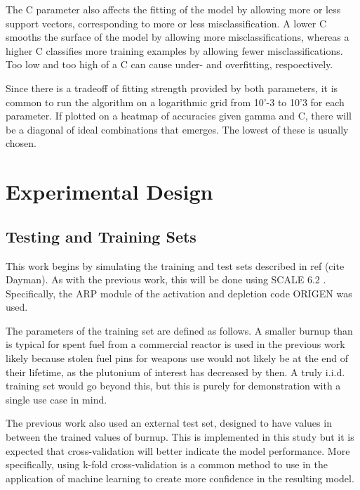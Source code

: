 \documentclass{anstrans}
\begin{document}
The C parameter also affects the fitting of the model by allowing more or less
support vectors, corresponding to more or less misclassification. A lower C
smooths the surface of the model by allowing more misclassifications, whereas a
higher C classifies more training examples by allowing fewer
misclassifications. Too low and too high of a C can cause under- and
overfitting, respoectively. 

Since there is a tradeoff of fitting strength provided by both parameters, it
is common to run the algorithm on a logarithmic grid from 10'-3 to 10'3 for
each parameter. If plotted on a heatmap of accuracies given gamma and C, there
will be a diagonal of ideal combinations that emerges. The lowest of these is
usually chosen. 


\section{Experimental Design}

\subsection{Testing and Training Sets}

This work begins by simulating the training and test sets described in ref
(cite Dayman). As with the previous work, this will be done using SCALE 6.2
. Specifically, the ARP module of the activation and depletion code
ORIGEN was used. 

The parameters of the training set are defined as follows. A smaller burnup
than is typical for spent fuel from a commercial reactor is used in the
previous work likely because stolen fuel pins for weapons use would not likely
be at the end of their lifetime, as the plutonium of interest has decreased by
then. A truly i.i.d. training set would go beyond this, but this is purely for
demonstration with a single use case in mind. 

The previous work also used an external test set, designed to have values in
between the trained values of burnup. This is implemented in this study but it
is expected that cross-validation will better indicate the model performance.
More specifically, using k-fold cross-validation is a common method to use in
the application of machine learning to create more confidence in the resulting
model. 
\end{document}
